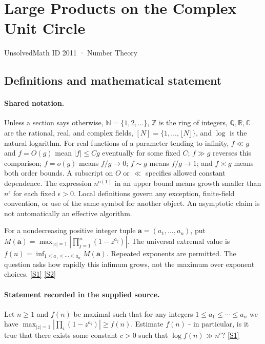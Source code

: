 \documentclass[11pt,a4paper]{article}
\newcommand{\N}{\mathbb{N}}
\newcommand{\Z}{\mathbb{Z}}
\newcommand{\Q}{\mathbb{Q}}
\newcommand{\R}{\mathbb{R}}
\newcommand{\C}{\mathbb{C}}
\newcommand{\sref}[2]{\hyperlink{source:#1:#2}{[S#2]}}
\begin{document}

\setcounter{section}{2010}

\section{Large Products on the Complex Unit Circle}\label{2011}

{\small\sffamily UnsolvedMath ID 2011 · Number Theory}

\subsection{Definitions and mathematical statement}

\paragraph{Shared notation.}Unless a section says otherwise, $\N=\{1,2,\ldots\}$,
$\Z$ is the ring of integers, $\Q,\R,\C$ are the rational, real, and complex
fields, $[N]=\{1,\ldots,\lfloor N\rfloor\}$, and $\log$ is the natural
logarithm. For real functions of a parameter tending to infinity,
$f\ll g$ and $f=O(g)$ mean $|f|\leq Cg$ eventually for some fixed $C$;
$f\gg g$ reverses this comparison; $f=o(g)$ means $f/g\to0$;
$f\sim g$ means $f/g\to1$; and $f\asymp g$ means both order bounds.
A subscript on $O$ or $\ll$ specifies allowed constant dependence.
The expression $n^{o(1)}$ in an upper bound means growth smaller than
$n^\epsilon$ for each fixed $\epsilon>0$. Local definitions govern any
exception, finite-field convention, or use of the same symbol for another
object. An asymptotic claim is not automatically an effective algorithm.



For a nondecreasing positive integer tuple $\mathbf a=(a_1,\ldots,a_n)$, put $M(\mathbf a)=\max_{|z|=1}|\prod_{j=1}^{n}(1-z^{a_j})|$. The universal extremal value is $f(n)=\inf_{1\leq a_1\leq\cdots\leq a_n}M(\mathbf a)$. Repeated exponents are permitted. The question asks how rapidly this infimum grows, not the maximum over exponent choices. \sref{2011}{1} \sref{2011}{2}

\paragraph{Statement recorded in the supplied source.}
Let $n\geq 1$ and $f(n)$ be maximal such that for any integers $1\leq a_1\leq \cdots \leq a_n$ we have $ \max_{\lvert z\rvert=1}\left\lvert \prod_{i}(1-z^{a_i})\right\rvert\geq f(n). $ Estimate $f(n)$ - in particular, is it true that there exists some constant $c>0$ such that $ \log f(n) \gg n^c? $ \sref{2011}{1}
\end{document}
